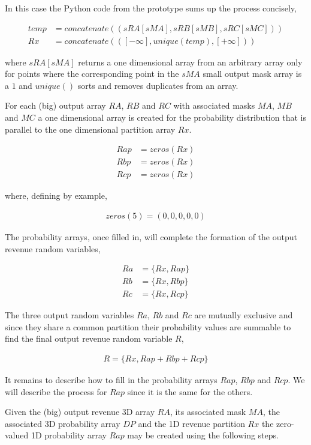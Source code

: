 In this case the Python code from the prototype sums up the process concisely,

\begin{align*}
temp &= concatenate((sRA[sMA], sRB[sMB], sRC[sMC]))\\
Rx &= concatenate(([-\infty], unique(temp), [+\infty]))
\end{align*}

where $sRA[sMA]$ returns a one dimensional array from an arbitrary array only for points where the corresponding point in the $sMA$ small output mask array is a $1$ and $unique()$ sorts and removes duplicates from an array. 

For each (big) output array $RA$, $RB$ and $RC$ with associated masks $MA$, $MB$ and $MC$ a one dimensional array is created for the probability distribution that is parallel to the one dimensional partition array $Rx$. 

\begin{align*}
Rap &= zeros(Rx)\\
Rbp &= zeros(Rx)\\
Rcp &= zeros(Rx)
\end{align*}

where, defining by example,

\begin{align*}
zeros(5) = (0, 0, 0, 0, 0)
\end{align*}

The probability arrays, once filled in, will complete the formation of the output revenue random variables,

\begin{align*}
Ra &= \{Rx, Rap\}\\
Rb &= \{Rx, Rbp\}\\
Rc &= \{Rx, Rcp\}
\end{align*}

The three output random variables $Ra$, $Rb$ and $Rc$ are mutually exclusive and since they share a common partition their probability values are summable to find the final output revenue random variable $R$,

\begin{align*}
R = \{Rx, Rap + Rbp + Rcp\}
\end{align*}

It remains to describe how to fill in the probability arrays $Rap$, $Rbp$ and $Rcp$. We will describe the process for $Rap$ since it is the same for the others.

Given the (big) output revenue 3D array $RA$, its associated mask $MA$, the associated 3D probability array $DP$ and the 1D revenue partition $Rx$ the zero-valued 1D probability array $Rap$ may be created using the following steps. 

